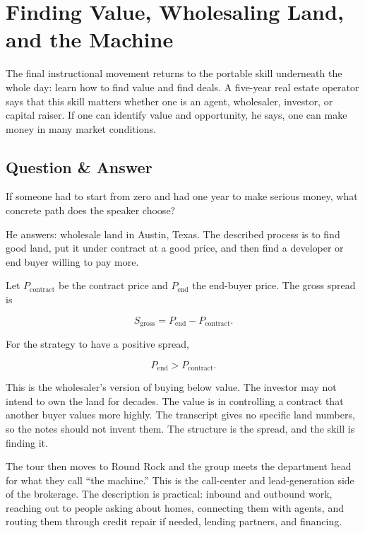 \section{Finding Value, Wholesaling Land, and the Machine}

The final instructional movement returns to the portable skill underneath the whole day: learn how to find value and find deals. A five-year real estate operator says that this skill matters whether one is an agent, wholesaler, investor, or capital raiser. If one can identify value and opportunity, he says, one can make money in many market conditions.

\subsection{Question \& Answer}

If someone had to start from zero and had one year to make serious money, what concrete path does the speaker choose?

He answers: wholesale land in Austin, Texas. The described process is to find good land, put it under contract at a good price, and then find a developer or end buyer willing to pay more.

Let \(P_{\mathrm{contract}}\) be the contract price and \(P_{\mathrm{end}}\) the end-buyer price. The gross spread is

\begin{equation}
S_{\mathrm{gross}}
=
P_{\mathrm{end}} - P_{\mathrm{contract}}.
\end{equation}

For the strategy to have a positive spread,

\begin{equation}
P_{\mathrm{end}} > P_{\mathrm{contract}}.
\end{equation}

This is the wholesaler's version of buying below value. The investor may not intend to own the land for decades. The value is in controlling a contract that another buyer values more highly. The transcript gives no specific land numbers, so the notes should not invent them. The structure is the spread, and the skill is finding it.

The tour then moves to Round Rock and the group meets the department head for what they call ``the machine.'' This is the call-center and lead-generation side of the brokerage. The description is practical: inbound and outbound work, reaching out to people asking about homes, connecting them with agents, and routing them through credit repair if needed, lending partners, and financing.

